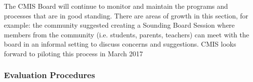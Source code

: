 \begin{findings}

The CMIS Board will continue to monitor and maintain the programs and processes that are in good standing. There are areas of growth in this section, for example: the community suggested creating a Sounding Board Session where members from the community (i.e. students, parents, teachers) can meet with the board in an informal setting to discuss concerns and suggestions. CMIS looks forward to piloting this process in March 2017
\end{findings}

\subsubsection{Evaluation Procedures}



